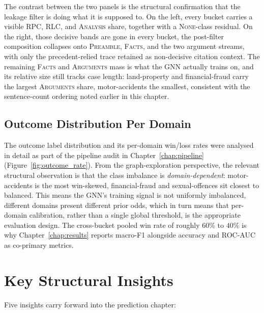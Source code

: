 The contrast between the two panels is the structural confirmation
that the leakage filter is doing what it is supposed to. On the left,
every bucket carries a visible \textsc{RPC}, \textsc{RLC}, and
\textsc{Analysis} share, together with a \textsc{None}-class residual.
On the right, those decisive bands are gone in every bucket, the
post-filter composition collapses onto \textsc{Preamble}, \textsc{Facts},
and the two argument streams, with only the precedent-relied trace
retained as non-decisive citation context. The remaining
\textsc{Facts} and \textsc{Arguments} mass is what the GNN actually
trains on, and its relative size still tracks case length: land-property
and financial-fraud carry the largest \textsc{Arguments} share,
motor-accidents the smallest, consistent with the sentence-count
ordering noted earlier in this chapter.

\subsection{Outcome Distribution Per Domain}

The outcome label distribution and its per-domain win/loss rates were analysed
in detail as part of the pipeline audit in
Chapter~\ref{chap:pipeline} (Figure~\ref{fig:outcome_rate}). From the
graph-exploration perspective, the relevant
structural observation is that the class imbalance is \emph{domain-dependent}:
motor-accidents is the most win-skewed, financial-fraud and sexual-offences sit
closest to balanced. This means the GNN's training signal is not uniformly
imbalanced, different domains present different prior odds, which in turn
means that per-domain calibration, rather than a single global threshold,
is the appropriate evaluation design. The cross-bucket pooled win rate of
roughly $60\%$ to $40\%$ is why Chapter~\ref{chap:results} reports macro-F1
alongside accuracy and ROC-AUC as co-primary metrics.

\section{Key Structural Insights}
\label{sec:key_insights}

Five insights carry forward into the prediction chapter:

